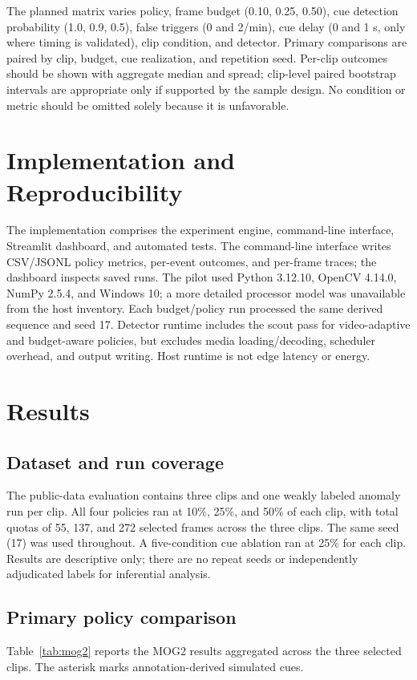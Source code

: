 \documentclass[conference]{IEEEtran}
\begin{document}
The planned matrix varies policy, frame budget (0.10, 0.25, 0.50), cue detection probability (1.0, 0.9, 0.5), false triggers (0 and 2/min), cue delay (0 and 1 s, only where timing is validated), clip condition, and detector. Primary comparisons are paired by clip, budget, cue realization, and repetition seed. Per-clip outcomes should be shown with aggregate median and spread; clip-level paired bootstrap intervals are appropriate only if supported by the sample design. No condition or metric should be omitted solely because it is unfavorable.

\section{Implementation and Reproducibility}
The implementation comprises the experiment engine, command-line interface, Streamlit dashboard, and automated tests. The command-line interface writes CSV/JSONL policy metrics, per-event outcomes, and per-frame traces; the dashboard inspects saved runs. The pilot used Python 3.12.10, OpenCV 4.14.0, NumPy 2.5.4, and Windows 10; a more detailed processor model was unavailable from the host inventory. Each budget/policy run processed the same derived sequence and seed 17. Detector runtime includes the scout pass for video-adaptive and budget-aware policies, but excludes media loading/decoding, scheduler overhead, and output writing. Host runtime is not edge latency or energy.

\section{Results}
\subsection{Dataset and run coverage}
The public-data evaluation contains three clips and one weakly labeled anomaly run per clip. All four policies ran at 10\%, 25\%, and 50\% of each clip, with total quotas of 55, 137, and 272 selected frames across the three clips. The same seed (17) was used throughout. A five-condition cue ablation ran at 25\% for each clip. Results are descriptive only; there are no repeat seeds or independently adjudicated labels for inferential analysis.

\subsection{Primary policy comparison}
Table~\ref{tab:mog2} reports the MOG2 results aggregated across the three selected clips. The asterisk marks annotation-derived simulated cues.
\end{document}

